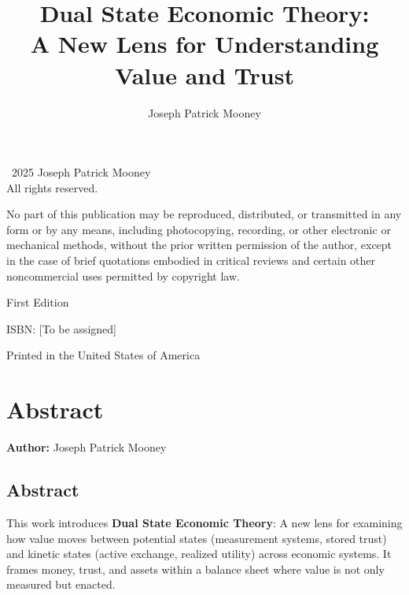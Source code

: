 \documentclass[11pt,oneside]{book}
\title{Dual State Economic Theory:\\A New Lens for Understanding Value and Trust}
\author{Joseph Patrick Mooney}
\date{}
\begin{document}
\maketitle
\thispagestyle{empty}

\newpage
\thispagestyle{empty}
\vspace*{\fill}
\begin{center}
\textcopyright\ 2025 Joseph Patrick Mooney\\
All rights reserved.\\

\vspace{1em}

No part of this publication may be reproduced, distributed, or transmitted in any form or by any means, including photocopying, recording, or other electronic or mechanical methods, without the prior written permission of the author, except in the case of brief quotations embodied in critical reviews and certain other noncommercial uses permitted by copyright law.

\vspace{2em}

First Edition

\vspace{2em}

ISBN: [To be assigned]

\vspace{2em}

Printed in the United States of America
\end{center}
\vspace*{\fill}

\newpage
\tableofcontents

\chapter*{Abstract}


\textbf{Author:} Joseph Patrick Mooney

\section*{Abstract}

This work introduces \textbf{Dual State Economic Theory}: A new lens for examining how value moves between potential states (measurement systems, stored trust) and kinetic states (active exchange, realized utility) across economic systems. It frames money, trust, and assets within a balance sheet where value is not only measured but enacted. 
\end{document}
